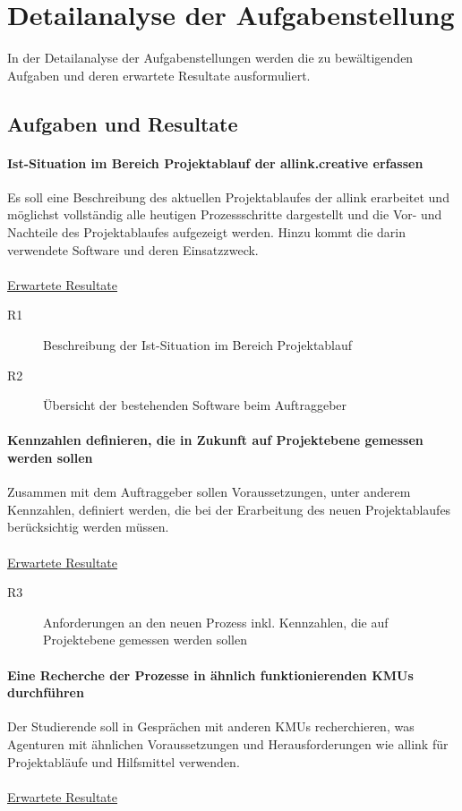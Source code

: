 \chapter{Detailanalyse der Aufgabenstellung}
In der Detailanalyse der Aufgabenstellungen werden die zu bewältigenden
Aufgaben und deren erwartete Resultate ausformuliert.

\section{Aufgaben und Resultate}
\subsubsection{Ist-Situation im Bereich Projektablauf der allink.creative erfassen}
Es soll eine Beschreibung des aktuellen Projektablaufes der allink erarbeitet
und möglichst vollständig alle heutigen Prozessschritte dargestellt und die Vor- 
und Nachteile des Projektablaufes aufgezeigt werden. Hinzu kommt die darin verwendete Software und
deren Einsatzzweck.
\\\\
\underline{Erwartete Resultate}

\begin{description}
    \item[R1] Beschreibung der Ist-Situation im Bereich Projektablauf
    \item[R2] Übersicht der bestehenden Software beim Auftraggeber
\end{description}

\subsubsection{Kennzahlen definieren, die in Zukunft auf Projektebene gemessen werden sollen}
Zusammen mit dem Auftraggeber sollen Voraussetzungen, unter anderem Kennzahlen,
definiert werden, die bei der Erarbeitung des neuen Projektablaufes berücksichtig
werden müssen. 
\\\\
\underline{Erwartete Resultate}

\begin{description}
    \item[R3] Anforderungen an den neuen Prozess inkl. Kennzahlen, die auf 
        Projektebene gemessen werden sollen
\end{description}
  
\subsubsection{Eine Recherche der Prozesse in ähnlich funktionierenden KMUs durchführen}
Der Studierende soll in Gesprächen mit anderen KMUs recherchieren, was Agenturen
mit ähnlichen Voraussetzungen und Herausforderungen wie allink für Projektabläufe
und Hilfsmittel verwenden.
\\\\
\underline{Erwartete Resultate}

